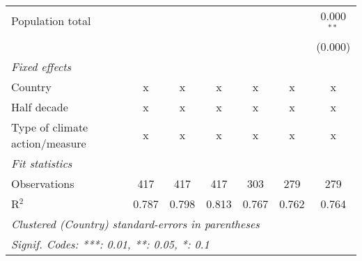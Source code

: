\begin{tabular}{lcccccc}
   Population total                                                &         &                &                &                &                & 0.000$^{**}$\\   
                                                                   &         &                &                &                &                & (0.000)\\   
   \emph{Fixed effects}\\
   Country                                                         & x       & x              & x              & x              & x              & x\\  
   Half decade                                                     & x       & x              & x              & x              & x              & x\\  
   Type of climate action/measure                                  & x       & x              & x              & x              & x              & x\\  
   \midrule \emph{Fit statistics}\\
   Observations                                                    & 417     & 417            & 417            & 303            & 279            & 279\\  
   R$^2$                                                           & 0.787   & 0.798          & 0.813          & 0.767          & 0.762          & 0.764\\  
   \midrule
   \multicolumn{7}{l}{\emph{Clustered (Country) standard-errors in parentheses}}\\
   \multicolumn{7}{l}{\emph{Signif. Codes: ***: 0.01, **: 0.05, *: 0.1}}\\
\end{tabular}
\par\endgroup


